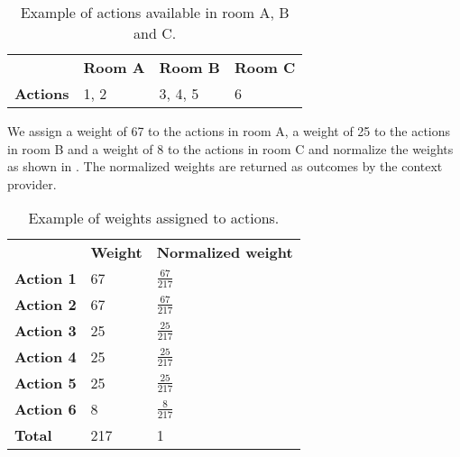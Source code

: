 \begin{table}[H!]
\centering
\caption{Example of actions available in room A, B and C.}
\label{tbl:sec:design:position-context-provider:actions}
\begin{tabular}{llll}
                 & \textbf{Room A} & \textbf{Room B} & \textbf{Room C} \\
\textbf{Actions} & 1, 2            & 3, 4, 5         & 6   
\end{tabular}
\end{table}

We assign a weight of 67 to the actions in room A, a weight of 25 to the actions in room B and a weight of 8 to the actions in room C and normalize the weights as shown in . The normalized weights are returned as outcomes by the context provider.

\begin{table}[]
\centering
\caption{Example of weights assigned to actions.}
\label{tbl:sec:design:position-context-provider:actions}
\begin{tabular}{lll}
                  & \textbf{Weight} & \textbf{Normalized weight} \\
\textbf{Action 1} & 67              & $\frac{67}{217}$                   \\
\textbf{Action 2} & 67              & $\frac{67}{217}$                   \\
\textbf{Action 3} & 25              & $\frac{25}{217}$                   \\
\textbf{Action 4} & 25              & $\frac{25}{217}$                   \\
\textbf{Action 5} & 25              & $\frac{25}{217}$                   \\
\textbf{Action 6} & 8               & $\frac{8}{217}$                    \\
\textbf{Total}    & 217             & 1                         
\end{tabular}
\end{table}

